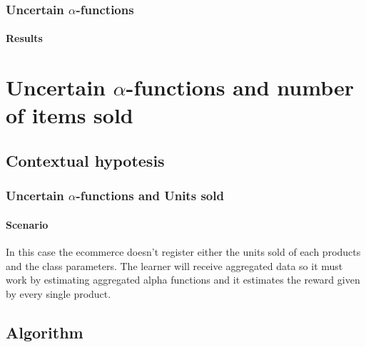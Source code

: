\documentclass[11pt]{beamer}
\begin{document}

\begin{frame}

\frametitle{Uncertain $\alpha$-functions}
\framesubtitle{Results}

\end{frame}


\AtBeginSection[]
{
\begin{frame}{}
    \tableofcontents[sections={\thesection}]
\end{frame}
}


\section{Uncertain $\alpha$-functions and number of items sold}


\subsection{Contextual hypotesis}


\begin{frame}

\frametitle{Uncertain $\alpha$-functions and Units sold}
\framesubtitle{Scenario}

In this case the ecommerce doesn't register either the units sold of each products and the class parameters.
The learner will receive aggregated data so it must work by estimating aggregated alpha functions and it estimates the reward given by every single product.

\end{frame}


\subsection{Algorithm}

\end{document}
